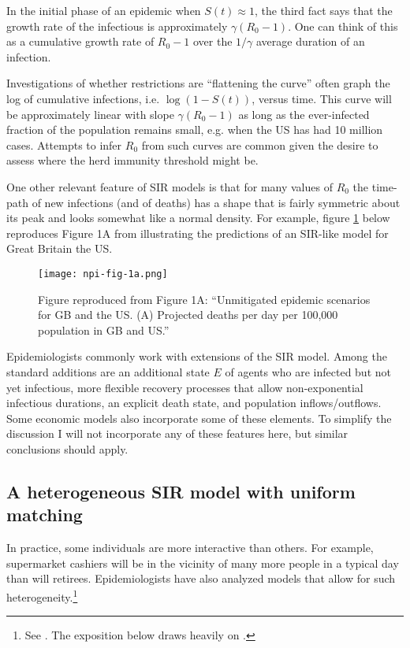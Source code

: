 \documentclass[11pt]{article}
\begin{document}
In the initial phase of an epidemic when $S(t) \approx 1$, the third fact says that the growth rate of the infectious is approximately 
$\gamma (R_0 - 1)$. One can think of this as a cumulative growth rate of $R_0 - 1$ over the $1/\gamma$ average duration of 
an infection. 

Investigations of whether restrictions are ``flattening the curve'' often graph the log of cumulative infections, i.e. $\log(1-S(t))$,
versus time. This curve will be approximately linear with slope $\gamma(R_0 - 1)$ as long as the ever-infected fraction of the population
remains small, e.g. when the US has had 10 million cases. Attempts to infer $R_0$ from such curves are common given the desire
to assess where the herd immunity threshold might be. 

One other relevant feature of SIR models is that for many values of $R_0$  the time-path of new infections (and of deaths) has a shape 
that is fairly symmetric about its peak and looks somewhat like a normal density. For example, figure \ref{f:symmetry}
below reproduces Figure 1A from \citet{ferguson2020impact} illustrating the predictions of an SIR-like model for Great Britain the US.

\begin{figure}
    \centering
    \texttt{[image: npi-fig-1a.png]}
    \caption{Figure reproduced from \citet{ferguson2020impact} Figure 1A: ``Unmitigated epidemic scenarios for GB and the US. (A) Projected deaths per day per 100,000 population in GB and US.''}
    \label{f:symmetry}
\end{figure}

Epidemiologists commonly work with extensions of the SIR model. Among the standard additions are an additional state $E$ of agents
who are infected but not yet infectious, more flexible recovery processes that allow non-exponential infectious durations, an explicit
death state, and population inflows/outflows. Some economic models also incorporate some of these elements. To simplify the
discussion I will not incorporate any of these features here, but similar conclusions should apply.  

\subsection{A heterogeneous SIR model with uniform matching}

In practice, some individuals are more interactive than others. For example, supermarket cashiers will be in the vicinity
of many more people in a typical day than will retirees. Epidemiologists have also analyzed models that 
allow for such heterogeneity.\footnote{See \citet{andreasen1989persistence, may1989transmission, diekmann1990definition, dushoff1995effects, jacquez1995core, hethcote2000mathematics, van2002reproduction}. 
The exposition below draws  heavily on \citet{dushoff1995effects}.} 
\end{document}
